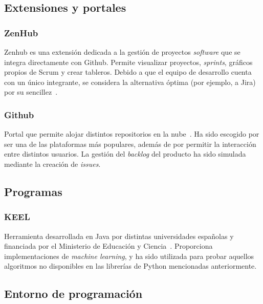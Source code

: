 \subsection{Extensiones y portales}

\subsubsection{ZenHub}

Zenhub es una extensión dedicada a la gestión de proyectos \textit{software} que se integra directamente con Github. Permite visualizar proyectos, \textit{sprints}, gráficos propios de Scrum y crear tableros. Debido a que el equipo de desarrollo cuenta con un único integrante, se considera la alternativa óptima (por ejemplo, a Jira) por su sencillez~\cite{zenhubHome}.

\subsubsection{Github}

Portal que permite alojar distintos repositorios en la nube~\cite{githubHome}. Ha sido escogido por ser una de las plataformas más populares, además de por permitir la interacción entre distintos usuarios. La gestión del \textit{backlog} del producto ha sido simulada mediante la creación de \textit{issues}.


\subsection{Programas}

\subsubsection{KEEL}

Herramienta desarrollada en Java por distintas universidades españolas y financiada por el Ministerio de Educación y Ciencia~\cite{keelRepo}. Proporciona implementaciones de \textit{machine learning}, y ha sido utilizada para probar aquellos algoritmos no disponibles en las librerías de Python mencionadas anteriormente.

\subsection{Entorno de programación}

